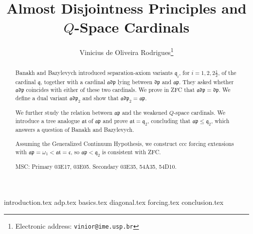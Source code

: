 \documentclass{article}
\title{Almost Disjointness Principles and $Q$-Space Cardinals}
\date{}
\author{Vinicius de Oliveira Rodrigues\thanks{Electronic address: \texttt{vinior@ime.usp.br}}}
\affil{University of São Paulo}
\theoremstyle{definition}
\begin{document}
\maketitle

\begin{abstract}
    Banakh and Bazylevych introduced separation-axiom variants $\mathfrak q_i$, for $i=1,2,2\frac{1}{2}$, of the cardinal $\mathfrak q$, together with a cardinal $\mathfrak{adp}$ lying between $\mathfrak{dp}$ and $\mathfrak{ap}$.
    They asked whether $\mathfrak{adp}$ coincides with either of these two cardinals.
    We prove in ZFC that $\mathfrak{adp}=\mathfrak{dp}$.
    We define a dual variant $\mathfrak{adp}_2$ and show that $\mathfrak{adp}_2=\mathfrak{ap}$.

    We further study the relation between $\mathfrak{ap}$ and the weakened $Q$-space cardinals.
    We introduce a tree analogue $\mathfrak{at}$ of $\mathfrak{ap}$ and prove $\mathfrak{at}=\mathfrak q_{2}$, concluding that $\mathfrak{ap}\leq\mathfrak q_{2}$, which answers a question of Banakh and Bazylevych.

    Assuming the Generalized Continuum Hypothesis, we construct ccc forcing extensions with $\mathfrak{ap}=\omega_1<\mathfrak{at}=\mathfrak c$, so $\mathfrak{ap}<\mathfrak q_2$ is consistent with ZFC.

    MSC: Primary 03E17, 03E05. Secondary 03E35, 54A35, 54D10.
\end{abstract}

{introduction.tex}
{adp.tex}
{basics.tex}
{diagonal.tex}
{forcing.tex}
{conclusion.tex}


\end{document}
